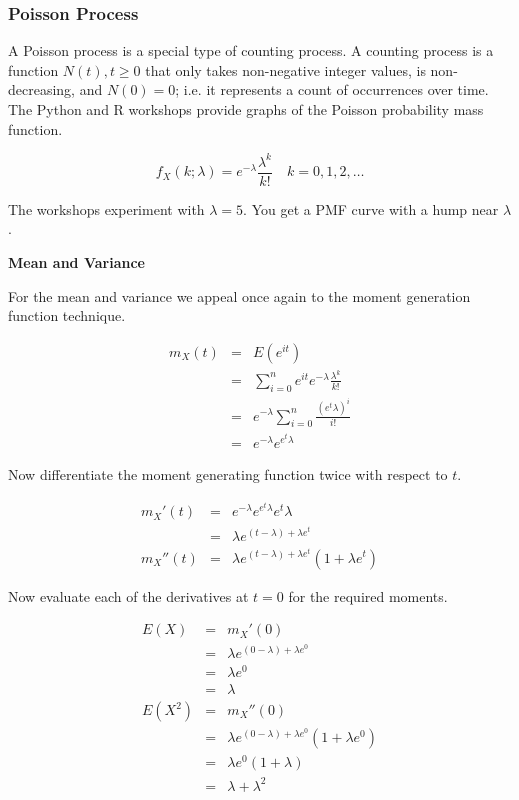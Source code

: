 \documentclass[]{article}
\begin{document}
\subsubsection{Poisson Process}
\label{subsec:poisson}

A Poisson process is a special type of counting process.
A counting process is a function $N(t), t \ge 0$ that
only takes non-negative integer values, is non-decreasing,
and $N(0)=0$;
i.e. it represents a count of occurrences over time.  The
Python and R workshops provide graphs of the Poisson
probability mass function.

\begin{equation} \label{poisson_pmf}
f_X(k; \lambda) = e^{-\lambda} \frac{\lambda^k}{k!} 
\quad k = 0, 1, 2, \ldots
\end{equation}

The workshops experiment with $\lambda = 5$.  You get a
PMF curve with a hump near $\lambda$.

\textbf{Mean and Variance}

For the mean and variance we appeal once again to the
moment generation function technique.

\begin{eqnarray*}
m_X(t) & = & E(e^{it}) \\
   & = & \sum_{i=0}^n e^{it} e^{-\lambda} \frac{\lambda^k}{k!} \\
   & = & e^{-\lambda} \sum_{i=0}^n \frac{(e^t \lambda)^i}{i!} \\
   & = & e^{-\lambda} e^{e^t \lambda}
\end{eqnarray*}

Now differentiate the moment generating function twice with
respect to $t$.

\begin{eqnarray*}
m_X'(t) & = & e^{-\lambda} e^{e^t \lambda} e^t \lambda \\
        & = & \lambda e^{(t-\lambda) + \lambda e^t} \\
m_X''(t) & = & \lambda e^{(t-\lambda) + \lambda e^t}(1+\lambda e^t)\end{eqnarray*}

Now evaluate each of the derivatives at $t=0$ for the
required moments.

\begin{eqnarray*}
E(X) & = & m_X'(0) \\
   & = & \lambda e^{(0-\lambda) + \lambda e^0} \\
   & = & \lambda e^0 \\
   & = & \lambda \label{poisson_mean} \\
E(X^2) & = & m_X''(0) \\
   & = & \lambda e^{(0-\lambda) + \lambda e^0}(1+\lambda e^0) \\
   & = & \lambda e^0(1+\lambda) \\
   & = & \lambda + \lambda^2
\end{eqnarray*}
\end{document}
